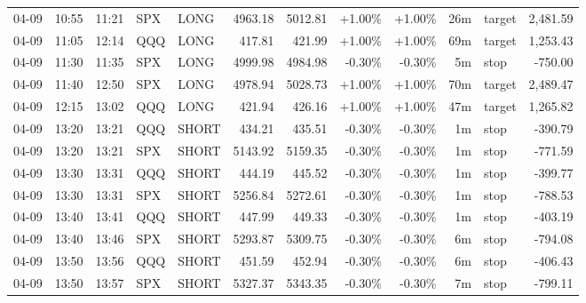 \documentclass[11pt,a4paper]{article}
\begin{document}
\begin{center}
\begin{longtable}{>{\color{txtmain}}l l l l l r r r r r >{\color{txtmain}}l r}
04-09 & 10:55 & 11:21 & SPX & LONG & 4963.18 & 5012.81 & \textcolor{wingreen}{+1.00\%} & \textcolor{wingreen}{+1.00\%} & 26m & target & \textcolor{wingreen}{2,481.59} \\
04-09 & 11:05 & 12:14 & QQQ & LONG & 417.81 & 421.99 & \textcolor{wingreen}{+1.00\%} & \textcolor{wingreen}{+1.00\%} & 69m & target & \textcolor{wingreen}{1,253.43} \\
04-09 & 11:30 & 11:35 & SPX & LONG & 4999.98 & 4984.98 & \textcolor{lossred}{-0.30\%} & \textcolor{lossred}{-0.30\%} & 5m & stop & \textcolor{lossred}{-750.00} \\
04-09 & 11:40 & 12:50 & SPX & LONG & 4978.94 & 5028.73 & \textcolor{wingreen}{+1.00\%} & \textcolor{wingreen}{+1.00\%} & 70m & target & \textcolor{wingreen}{2,489.47} \\
04-09 & 12:15 & 13:02 & QQQ & LONG & 421.94 & 426.16 & \textcolor{wingreen}{+1.00\%} & \textcolor{wingreen}{+1.00\%} & 47m & target & \textcolor{wingreen}{1,265.82} \\
04-09 & 13:20 & 13:21 & QQQ & SHORT & 434.21 & 435.51 & \textcolor{lossred}{-0.30\%} & \textcolor{lossred}{-0.30\%} & 1m & stop & \textcolor{lossred}{-390.79} \\
04-09 & 13:20 & 13:21 & SPX & SHORT & 5143.92 & 5159.35 & \textcolor{lossred}{-0.30\%} & \textcolor{lossred}{-0.30\%} & 1m & stop & \textcolor{lossred}{-771.59} \\
04-09 & 13:30 & 13:31 & QQQ & SHORT & 444.19 & 445.52 & \textcolor{lossred}{-0.30\%} & \textcolor{lossred}{-0.30\%} & 1m & stop & \textcolor{lossred}{-399.77} \\
04-09 & 13:30 & 13:31 & SPX & SHORT & 5256.84 & 5272.61 & \textcolor{lossred}{-0.30\%} & \textcolor{lossred}{-0.30\%} & 1m & stop & \textcolor{lossred}{-788.53} \\
04-09 & 13:40 & 13:41 & QQQ & SHORT & 447.99 & 449.33 & \textcolor{lossred}{-0.30\%} & \textcolor{lossred}{-0.30\%} & 1m & stop & \textcolor{lossred}{-403.19} \\
04-09 & 13:40 & 13:46 & SPX & SHORT & 5293.87 & 5309.75 & \textcolor{lossred}{-0.30\%} & \textcolor{lossred}{-0.30\%} & 6m & stop & \textcolor{lossred}{-794.08} \\
04-09 & 13:50 & 13:56 & QQQ & SHORT & 451.59 & 452.94 & \textcolor{lossred}{-0.30\%} & \textcolor{lossred}{-0.30\%} & 6m & stop & \textcolor{lossred}{-406.43} \\
04-09 & 13:50 & 13:57 & SPX & SHORT & 5327.37 & 5343.35 & \textcolor{lossred}{-0.30\%} & \textcolor{lossred}{-0.30\%} & 7m & stop & \textcolor{lossred}{-799.11} \\

\end{longtable}
\end{center}
\end{document}

